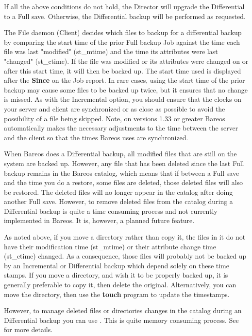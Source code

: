 \begin{description}
\begin{description}
If all the above conditions do not hold, the Director will  upgrade the
Differential to a Full save. Otherwise, the  Differential backup will be
performed as requested.

The File daemon (Client) decides which files to backup for a
differential backup by comparing the start time of the prior Full backup
Job against the time each file was last "modified" (st\_mtime) and the
time its attributes were last "changed" (st\_ctime).  If the file was
modified or its attributes were changed on or after this start time, it
will then be backed up.  The start time used is displayed after the {\bf
Since} on the Job report.  In rare cases, using the start time of the
prior backup may cause some files to be backed up twice, but it ensures
that no change is missed.  As with the Incremental option, you should
ensure that the clocks on your server and client are synchronized or as
close as possible to avoid the possibility of a file being skipped.
Note, on versions 1.33 or greater Bareos automatically makes the
necessary adjustments to the time between the server and the client so
that the times Bareos uses are synchronized.

When Bareos does a Differential backup, all modified files that are
still on the system are backed up.  However, any file that has been
deleted since the last Full backup remains in the Bareos catalog, which
means that if between a Full save and the time you do a restore, some
files are deleted, those deleted files will also be restored.  The
deleted files will no longer appear in the catalog after doing another
Full save.  However, to remove deleted files from the catalog during a
Differential backup is quite a time consuming process and not currently
implemented in Bareos.  It is, however, a planned future feature.

As noted above, if you move a directory rather than copy it, the
files in it do not have their modification time (st\_mtime) or
their attribute change time (st\_ctime) changed.  As a
consequence, those files will probably not be backed up by an
Incremental or Differential backup which depend solely on these
time stamps.  If you move a directory, and wish it to be
properly backed up, it is generally preferable to copy it, then
delete the original. Alternatively, you can move the directory, then
use the {\bf touch} program to update the timestamps.

However, to manage deleted files or directories changes in the
catalog during an Differential backup you can use .
This is quite memory consuming process. See  for more details.


\end{description}
\end{description}

